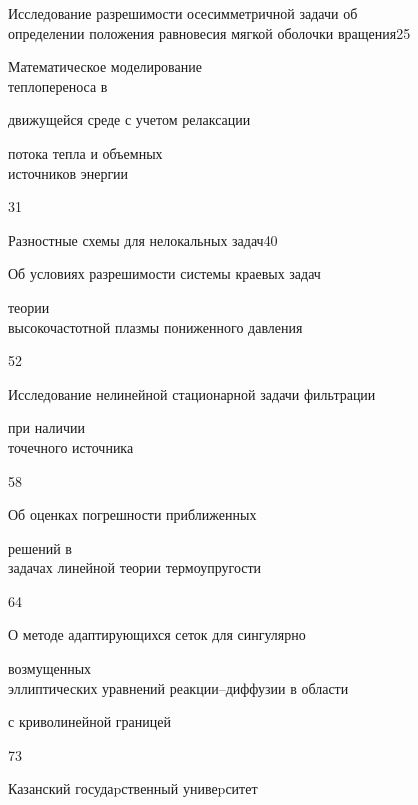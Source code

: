 

{Исследование разрешимости осесимметричной задачи об\\


определении положения равновесия мягкой оболочки вращения}{25}




{Математическое моделирование\\ теплопереноса в


движущейся среде с учетом релаксации


потока тепла и объемных\\ источников энергии}{31}




{Разностные схемы для нелокальных задач}{40}




{Об условиях разрешимости системы краевых задач


теории\\ высокочастотной плазмы пониженного давления}{52}




{Исследование нелинейной стационарной задачи фильтрации


при наличии\\ точечного источника}{58}




{Об оценках погрешности приближенных


решений в\\ задачах линейной теории термоупругости}{64}




{О методе адаптирующихся сеток для сингулярно


возмущенных\\ эллиптических уравнений реакции--диффузии в области


с криволинейной границей}{73}














\vfill


\noindent\raisebox{2pt}{\copyright} Казанский госудаpственный унивеpситет





